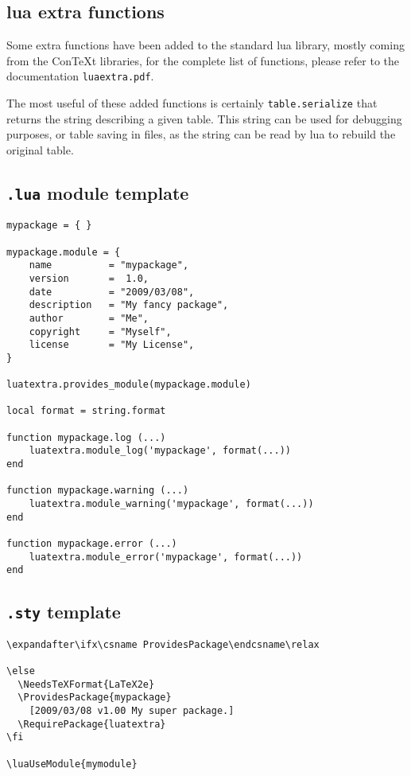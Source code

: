 \documentclass{article}
\begin{document}
\subsection{lua extra functions}

Some extra functions have been added to the standard lua library, mostly coming from the Con\TeX t libraries, for the complete list of functions, please refer to the documentation \texttt{luaextra.pdf}.

The most useful of these added functions is certainly \texttt{table.serialize} that returns the string describing a given table. This string can be used for debugging purposes, or table saving in files, as the string can be read by lua to rebuild the original table.

\subsection{\texttt{.lua} module template\label{sub:luatemplate}}

\begin{verbatim}
mypackage = { }

mypackage.module = {
    name          = "mypackage",
    version       =  1.0,
    date          = "2009/03/08",
    description   = "My fancy package",
    author        = "Me",
    copyright     = "Myself",
    license       = "My License",
}

luatextra.provides_module(mypackage.module)

local format = string.format

function mypackage.log (...)
    luatextra.module_log('mypackage', format(...))
end

function mypackage.warning (...)
    luatextra.module_warning('mypackage', format(...))
end

function mypackage.error (...)
    luatextra.module_error('mypackage', format(...))
end
\end{verbatim}

\subsection{\texttt{.sty} template}

\begin{verbatim}
\expandafter\ifx\csname ProvidesPackage\endcsname\relax
  
\else
  \NeedsTeXFormat{LaTeX2e}
  \ProvidesPackage{mypackage}
    [2009/03/08 v1.00 My super package.]
  \RequirePackage{luatextra}
\fi

\luaUseModule{mymodule}
\end{verbatim}
\end{document}
